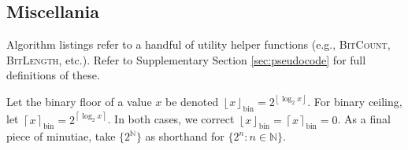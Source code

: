 
\subsection{Miscellania}

Algorithm listings refer to a handful of utility helper functions (e.g., \textsc{BitCount}, \textsc{BitLength}, etc.).
Refer to Supplementary Section \ref{sec:pseudocode} for full definitions of these.

Let the binary floor of a value $x$ be denoted $\left\lfloor x \right\rfloor_\mathrm{bin} = 2^{\left\lfloor \log_2 x \right\rfloor}$.
For binary ceiling, let $\left\lceil x \right\rceil_\mathrm{bin} = 2^{\left\lceil \log_2 x \right\rceil}$.
In both cases, we correct $\left\lfloor x \right\rfloor_\mathrm{bin} = \left\lceil x \right\rceil_\mathrm{bin} = 0$.
As a final piece of minutiae, take $\{2^{\mathbb{N}}\}$ as shorthand for $\{2^n : n \in \mathbb{N} \}$.
